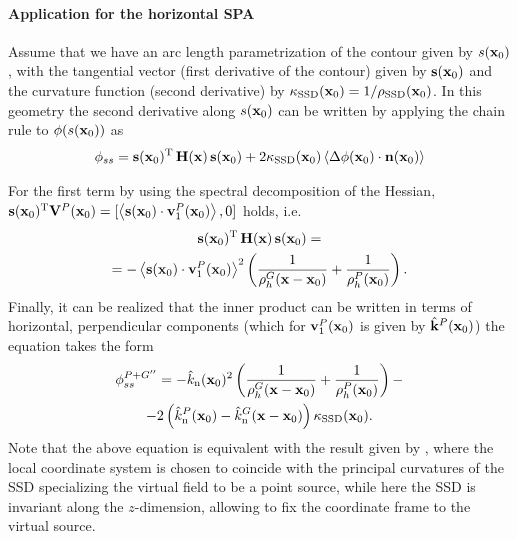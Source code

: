 \paragraph{Application for the horizontal SPA}
Assume that we have an arc length parametrization of the contour given by $s(\mathbf{x}_0)$, with the tangential vector (first derivative of the contour) given by $\mathbf{s}(\mathbf{x}_0)$ and the curvature function (second derivative) by $\kappa_{\mathrm{SSD}}(\mathbf{x}_0) = 1 / \rho_{\mathrm{SSD}}(\mathbf{x}_0)$.  
In this geometry the second derivative along $s(\mathbf{x}_0)$ can be written by applying the chain rule to $\phi(s(\mathbf{x}_0))$ as
\begin{multline}
  \phi_{ss} = \mathbf{s}(\mathbf{x}_0)^{\mathrm{T}} \, \mathbf{H}(\mathbf{x}) \, \mathbf{s}(\mathbf{x}_0) + 2\kappa_{\mathrm{SSD}}(\mathbf{x}_0) \left< \Delta \phi(\mathbf{x}_0) \cdot \mathbf{n}(\mathbf{x}_0) \right>
\end{multline}

For the first term by using the spectral decomposition of the Hessian, $\mathbf{s}(\mathbf{x}_0)^{\mathrm{T}} \mathbf{V}^P(\mathbf{x}_0) = [\left<\mathbf{s}(\mathbf{x}_0) \cdot \mathbf{v}_1^P(\mathbf{x}_0)\right>,0]$ holds, i.e.
\begin{multline}
  \small
  \mathbf{s}(\mathbf{x}_0)^{\mathrm{T}} \, \mathbf{H}(\mathbf{x}) \, \mathbf{s}(\mathbf{x}_0)  = \\ =
  -\left<\mathbf{s}(\mathbf{x}_0) \cdot \mathbf{v}_1^P(\mathbf{x}_0)\right>^2 \left(\frac{1}{\rho^G_h(\mathbf{x}-\mathbf{x}_0)} + \frac{1}{\rho^P_h(\mathbf{x}_0)} \right).
\end{multline}
Finally, it can be realized that the inner product can be written in terms of horizontal, perpendicular components (which for $\mathbf{v}_1^P(\mathbf{x}_0)$ is given by $\hat{\mathbf{k}}^P(\mathbf{x}_0)$) the equation takes the form
\begin{multline}
  \phi^{P+G''}_{ss} = 
   -\hat{k}_{\mathrm{n}}(\mathbf{x}_0)^2 \left(\frac{1}{\rho^G_h(\mathbf{x}-\mathbf{x}_0)} + \frac{1}{\rho^P_h(\mathbf{x}_0)} \right) - \\
   -2 \left( \hat{k}^P_{\mathrm{n}}(\mathbf{x}_0) - \hat{k}^G_{\mathrm{n}}(\mathbf{x}-\mathbf{x}_0)\right) \kappa_{\mathrm{SSD}}(\mathbf{x}_0).
   \label{eq:curvature_horiz}
\end{multline}
Note that the above equation is equivalent with the result given by \cite[Eq. 8.4.22.]{Bleistein1984}, where the local coordinate system is chosen to coincide with the principal curvatures of the SSD specializing the virtual field to be a point source, while here the SSD is invariant along the $z$-dimension, allowing to fix the coordinate frame to the virtual source.  

